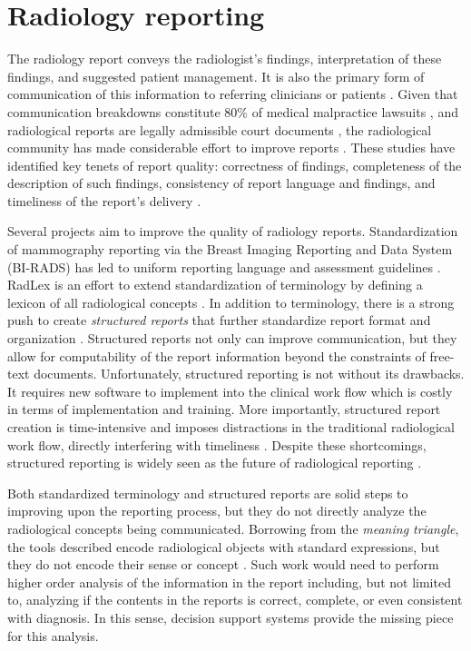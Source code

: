 \section{Radiology reporting}
The radiology report conveys the radiologist's findings, interpretation of these findings, and suggested patient management. It is also the primary form of communication of this information to referring clinicians or patients \cite{Sistrom:2005cx}. Given that communication breakdowns constitute 80\% of medical malpractice lawsuits \cite{Levinson:1994ko}, and radiological reports are legally admissible court documents \cite{Oppenheim:2012tq}, the radiological community has made considerable effort to improve reports \cite{Langlotz:2015vq}. These studies have identified key tenets of report quality: correctness of findings, completeness of the description of such findings, consistency of report language and findings, and timeliness of the report's delivery \cite{Johnson:2004kh, HaraldO:2004hi, Reiner:2006fa}. 

Several projects aim to improve the quality of radiology reports. Standardization of mammography reporting via the Breast Imaging Reporting and Data System (BI-RADS) has led to uniform reporting language and assessment guidelines \cite{Liberman:ws,Langlotz:2009fn,Burnside:2009ki}. RadLex is an effort to extend standardization of terminology by defining a lexicon of all radiological concepts \cite{Langlotz:2006jn}. In addition to terminology, there is a strong push to create \emph{structured reports} that further standardize report format and organization \cite{Langlotz:2009dd,Reiner:2009ib}. Structured reports not only can improve communication, but they allow for computability of the report information beyond the constraints of free-text documents. Unfortunately, structured reporting is not without its drawbacks. It requires new software to implement into the clinical work flow which is costly in terms of implementation and training. More importantly, structured report creation is time-intensive and imposes distractions in the traditional radiological work flow, directly interfering with timeliness \cite{Weiss:2008er}. Despite these shortcomings, structured reporting is widely seen as the future of radiological reporting \cite{Langlotz:2015vq}.

Both standardized terminology and structured reports are solid steps to improving upon the reporting process, but they do not directly analyze the radiological concepts being communicated. Borrowing from the \emph{meaning triangle}, the tools described encode radiological objects with standard expressions, but they do not encode their sense or concept \cite{Mead:2006wm}. Such work would need to perform higher order analysis of the information in the report including, but not limited to, analyzing if the contents in the reports is correct, complete, or even consistent with diagnosis. In this sense, decision support systems provide the missing piece for this analysis.

